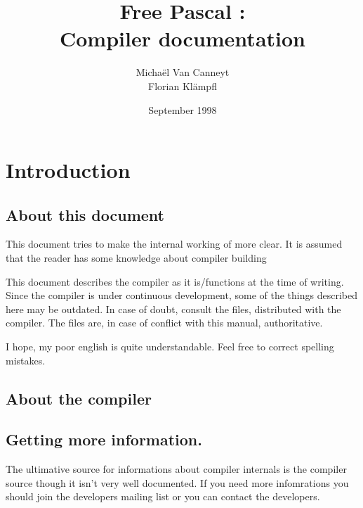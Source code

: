 \documentclass{report}
\begin{document}
\title{Free Pascal :\\ Compiler documentation}
\date{September 1998}
\author{Micha\"el Van Canneyt\\Florian Kl\"ampfl}
\maketitle
\tableofcontents
\chapter{Introduction}

\section{About this document}

This document tries to make the internal working of \fpc more clear.
It is assumed that the reader has some knowledge about compiler
building

This document describes the compiler as it is/functions at the time of
writing. Since the compiler is under continuous development, some of the
things described here may be outdated. In case of doubt, consult the
 files, distributed with the compiler.
The  files are, in case of conflict with this manual,
 authoritative.

I hope, my poor english is quite understandable. Feel free to correct
spelling mistakes.

\section{About the compiler}

\section{Getting more information.}

The ultimative source for informations about compiler internals is
the compiler source though it isn't very well documented. If you
need more infomrations you should join the developers mailing
list or you can contact the developers.
\end{document}
